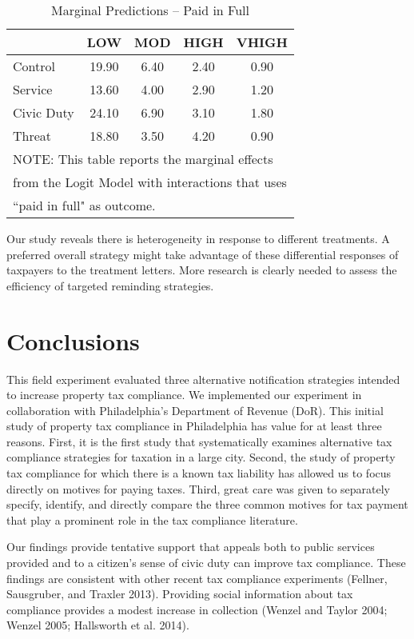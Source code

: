 \documentclass[12pt,titlepage]{article}
\begin{document}
\begin{table}[htbp]
\caption{Marginal Predictions -- Paid in Full}  \label{TT}
\bigskip
\begin{center}
\begin{tabular}{| l | c | c | c | c |}
  \hline
 & LOW & MOD & HIGH & VHIGH \\ 
  \hline
Control & 19.90 & 6.40 & 2.40 & 0.90 \\ 
  Service & 13.60 & 4.00 & 2.90 & 1.20 \\ 
  Civic Duty & 24.10 & 6.90 & 3.10 & 1.80 \\ 
  Threat & 18.80 & 3.50 & 4.20 & 0.90 \\ 
   \hline
\multicolumn{5}{l}{NOTE: This table reports the marginal effects} \\
\multicolumn{5}{l}{from the Logit Model with interactions that uses} \\
\multicolumn{5}{l}{``paid in full" as outcome.} \\
\end{tabular}
\end{center}
\end{table}

Our study reveals there is heterogeneity in response to different
treatments.  A preferred overall strategy might take advantage of
these differential responses of taxpayers to the treatment
letters. More research is clearly needed to assess the efficiency of
targeted reminding strategies.


\section{Conclusions}

This field experiment evaluated three alternative notification
strategies intended to increase property tax compliance.  We 
implemented our experiment in collaboration with Philadelphia's
Department of Revenue (DoR).  This initial study of property
tax compliance in Philadelphia has value for at least three reasons.
First, it is the first study that systematically examines alternative
tax compliance strategies for taxation in a large city.  Second, the
study of property tax compliance for which there is a known tax
liability has allowed us to focus directly on motives for paying
taxes.  Third, great care was given to separately specify, identify,
and directly compare the three common motives for tax payment that
play a prominent role in the tax compliance literature.

Our findings provide tentative support that appeals both to public
services provided and to a citizen's sense of civic duty can improve
tax compliance. These findings are consistent with other recent tax compliance
experiments (Fellner, Sausgruber, and Traxler 2013). Providing social information about
tax compliance provides a modest increase in collection (Wenzel and
Taylor 2004; Wenzel 2005; Hallsworth et al. 2014).
\end{document}
